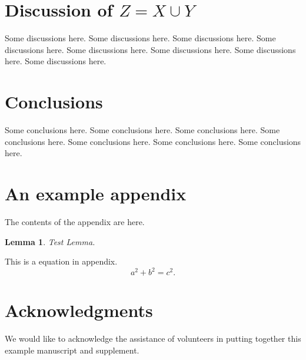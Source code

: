 \documentclass[10pt,reqno,final]{article}
\theoremstyle{plain}
\newtheorem{lemma}{Lemma}[section]
\theoremstyle{definition}
\theoremstyle{remark}
\numberwithin{equation}{section}
\numberwithin{figure}{section}
\numberwithin{table}{section}
\begin{document}
\section{Discussion of \texorpdfstring{{\boldmath$Z=X \cup Y$}}{Z = X union Y}}
\label{sec:discussion}

Some discussions here. Some discussions here. Some discussions here.
Some discussions here. Some discussions here. Some discussions here.
Some discussions here. Some discussions here.

\section{Conclusions}
\label{sec:conclusions}

Some conclusions here. Some conclusions here. Some conclusions here.
Some conclusions here. Some conclusions here. Some conclusions here.
Some conclusions here.


\appendix
\section{An example appendix}

The contents of the appendix are here.

\begin{lemma}
Test Lemma.
\end{lemma}

This is a equation in appendix.
\begin{equation}\label{eq:A1}
  a^2+b^2=c^2.
\end{equation}

\section*{Acknowledgments}

We would like to acknowledge the assistance of volunteers in putting together this example manuscript and supplement.


%



\end{document}
